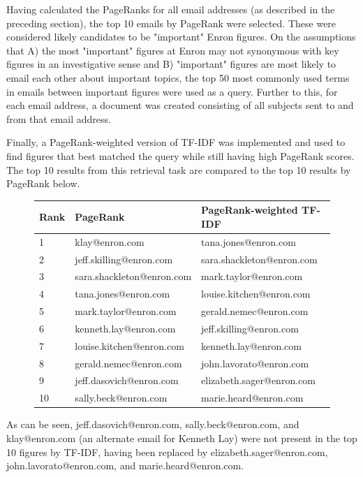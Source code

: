 \documentclass{article}
\begin{document}
Having calculated the PageRanks for all email addresses (as described in the preceding section), the top 10 emails by PageRank were selected. These were considered likely candidates to be "important" Enron figures. On the assumptions that A) the most "important" figures at Enron may not synonymous with key figures in an investigative sense and B) "important" figures are most likely to email each other about important topics, the top 50 most commonly used terms in emails between important figures were used as a query. Further to this, for each email address, a document was created consisting of all subjects sent to and from that email address. 

Finally, a PageRank-weighted version of TF-IDF was implemented and used to find figures that best matched the query while still having high PageRank scores. The top 10 results from this retrieval task are compared to the top 10 results by PageRank below.
\begin{figure}
\begin{tabular}{l | l | l}
Rank & PageRank & PageRank-weighted TF-IDF \\
\hline
1 & klay@enron.com & tana.jones@enron.com \\
2 & jeff.skilling@enron.com & sara.shackleton@enron.com \\
3 & sara.shackleton@enron.com & mark.taylor@enron.com \\
4 & tana.jones@enron.com & louise.kitchen@enron.com \\
5 & mark.taylor@enron.com & gerald.nemec@enron.com \\
6 & kenneth.lay@enron.com & jeff.skilling@enron.com \\
7 & louise.kitchen@enron.com & kenneth.lay@enron.com \\
8 & gerald.nemec@enron.com & john.lavorato@enron.com \\
9 & jeff.dasovich@enron.com & elizabeth.sager@enron.com \\
10 & sally.beck@enron.com & marie.heard@enron.com \\

\end{tabular}
\end{figure}

As can be seen, jeff.dasovich@enron.com, sally.beck@enron.com, and klay@enron.com (an alternate email for Kenneth Lay) were not present in the top 10 figures by TF-IDF, having been replaced by elizabeth.sager@enron.com, john.lavorato@enron.com, and marie.heard@enron.com.
\end{document}
